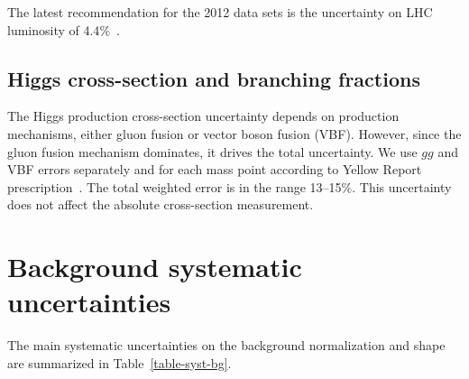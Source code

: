 The latest recommendation for the 2012 data sets is the uncertainty on LHC luminosity of 4.4$\%$~\cite{CMS-PAS-LUM-12-001}.

\subsection*{Higgs cross-section and branching fractions}

The Higgs production cross-section uncertainty depends on production mechanisms, either gluon fusion or vector boson fusion (VBF). However, since the gluon fusion mechanism dominates, it drives the total uncertainty.  We use $gg$ and VBF errors separately and for each mass point according to Yellow Report prescription~\cite{LHCHiggsCrossSectionWorkingGroup:2012ti}. The total weighted error is in the range 13--15\%. This uncertainty does not affect the absolute cross-section measurement.

















\section{Background systematic uncertainties}

The main systematic uncertainties on the background normalization and shape are summarized in Table~\ref{table-syst-bg}.


